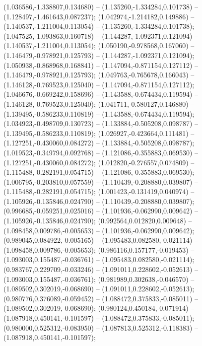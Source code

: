  (1.036586,-1.338807,0.134680) -- (1.135260,-1.334284,0.101738) -- (1.128497,-1.461643,0.087237);
 (1.042974,-1.214182,0.149886) -- (1.140537,-1.211004,0.113054) -- (1.135260,-1.334284,0.101738);
 (1.047525,-1.093863,0.160718) -- (1.144287,-1.092371,0.121094) -- (1.140537,-1.211004,0.113054);
 (1.050190,-0.978568,0.167060) -- (1.146479,-0.978921,0.125793) -- (1.144287,-1.092371,0.121094);
 (1.050938,-0.868968,0.168841) -- (1.147094,-0.871154,0.127112) -- (1.146479,-0.978921,0.125793);
 (1.049763,-0.765678,0.166043) -- (1.146128,-0.769523,0.125040) -- (1.147094,-0.871154,0.127112);
 (1.046676,-0.669242,0.158696) -- (1.143588,-0.674434,0.119594) -- (1.146128,-0.769523,0.125040);
 (1.041711,-0.580127,0.146880) -- (1.139495,-0.586233,0.110819) -- (1.143588,-0.674434,0.119594);
 (1.034923,-0.498709,0.130723) -- (1.133884,-0.505208,0.098787) -- (1.139495,-0.586233,0.110819);
 (1.026927,-0.423664,0.111481) -- (1.127251,-0.430060,0.084272) -- (1.133884,-0.505208,0.098787);
 (1.019523,-0.349794,0.092768) -- (1.121086,-0.355883,0.069530) -- (1.127251,-0.430060,0.084272);
 (1.012820,-0.276557,0.074809) -- (1.115488,-0.282191,0.054715) -- (1.121086,-0.355883,0.069530);
 (1.006795,-0.203810,0.057559) -- (1.110439,-0.208880,0.039807) -- (1.115488,-0.282191,0.054715);
 (1.001423,-0.131419,0.040974) -- (1.105926,-0.135846,0.024790) -- (1.110439,-0.208880,0.039807);
 (0.996685,-0.059251,0.025016) -- (1.101936,-0.062990,0.009642) -- (1.105926,-0.135846,0.024790);
 (0.992564,0.012820,0.009648) -- (1.098458,0.009786,-0.005653) -- (1.101936,-0.062990,0.009642);
 (0.989045,0.084922,-0.005165) -- (1.095483,0.082580,-0.021114) -- (1.098458,0.009786,-0.005653);
 (0.986116,0.157177,-0.019453) -- (1.093003,0.155487,-0.036761) -- (1.095483,0.082580,-0.021114);
 (0.983767,0.229709,-0.033246) -- (1.091011,0.228602,-0.052613) -- (1.093003,0.155487,-0.036761);
 (0.981989,0.302638,-0.046570) -- (1.089502,0.302019,-0.068690) -- (1.091011,0.228602,-0.052613);
 (0.980776,0.376089,-0.059452) -- (1.088472,0.375833,-0.085011) -- (1.089502,0.302019,-0.068690);
 (0.980124,0.450184,-0.071914) -- (1.087918,0.450141,-0.101597) -- (1.088472,0.375833,-0.085011);
 (0.980000,0.525312,-0.083950) -- (1.087813,0.525312,-0.118383) -- (1.087918,0.450141,-0.101597);
